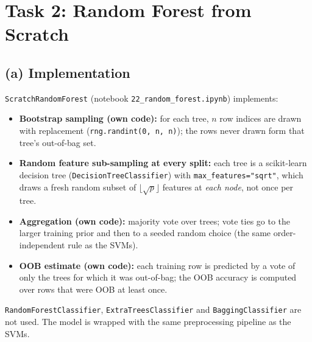 \documentclass[11pt]{article}
\begin{document}
\section{Task 2: Random Forest from Scratch}
\subsection{(a) Implementation}
\texttt{ScratchRandomForest} (notebook \texttt{22\_random\_forest.ipynb}) implements:
\begin{itemize}
\item \textbf{Bootstrap sampling (own code):} for each tree, $n$ row indices are drawn with replacement
(\texttt{rng.randint(0, n, n)}); the rows never drawn form that tree's out-of-bag set.
\item \textbf{Random feature sub-sampling at every split:} each tree is a scikit-learn decision tree
(\texttt{DecisionTreeClassifier}) with \texttt{max\_features="sqrt"}, which draws a fresh random subset of
$\lfloor\sqrt{p}\rfloor$ features at \emph{each node}, not once per tree.
\item \textbf{Aggregation (own code):} majority vote over trees; vote ties go to the larger training
prior and then to a seeded random choice (the same order-independent rule as the SVMs).
\item \textbf{OOB estimate (own code):} each training row is predicted by a vote of only the trees
for which it was out-of-bag; the OOB accuracy is computed over rows that were OOB at least once.
\end{itemize}
\texttt{RandomForestClassifier}, \texttt{ExtraTreesClassifier} and \texttt{BaggingClassifier} are not
used. The model is wrapped with the same preprocessing pipeline as the SVMs.
\end{document}
